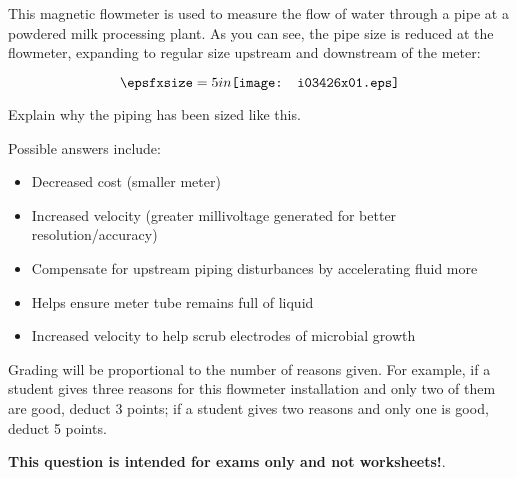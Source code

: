 

This magnetic flowmeter is used to measure the flow of water through a pipe at a powdered milk processing plant.  As you can see, the pipe size is reduced at the flowmeter, expanding to regular size upstream and downstream of the meter:

$$\epsfxsize=5in \texttt{[image: i03426x01.eps]}$$

Explain why the piping has been sized like this.







Possible answers include:

\begin{itemize}
\item{} Decreased cost (smaller meter)
\item{} Increased velocity (greater millivoltage generated for better resolution/accuracy)
\item{} Compensate for upstream piping disturbances by accelerating fluid more
\item{} Helps ensure meter tube remains full of liquid
\item{} Increased velocity to help scrub electrodes of microbial growth
\end{itemize}

Grading will be proportional to the number of reasons given.  For example, if a student gives three reasons for this flowmeter installation and only two of them are good, deduct 3 points; if a student gives two reasons and only one is good, deduct 5 points.







{\bf This question is intended for exams only and not worksheets!}.



